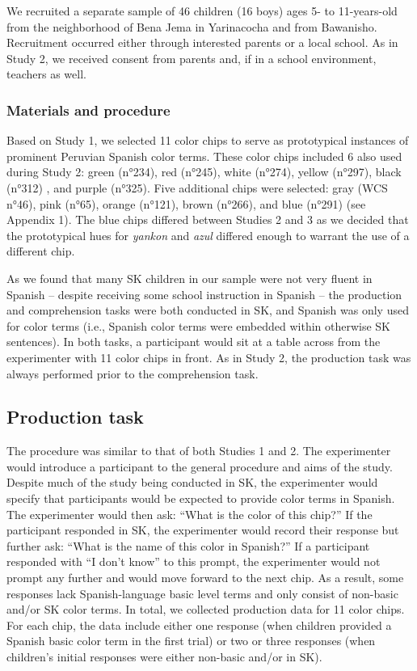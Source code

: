 \documentclass[
  english,
  ,apa7,floatsintext]{apa6}
\begin{document}
We recruited a separate sample of 46 children (16 boys) ages 5- to 11-years-old from the neighborhood of Bena Jema in Yarinacocha and from Bawanisho. Recruitment occurred either through interested parents or a local school. As in Study 2, we received consent from parents and, if in a school environment, teachers as well.

\hypertarget{materials-and-procedure-2}{%
\subsubsection{Materials and procedure}\label{materials-and-procedure-2}}

Based on Study 1, we selected 11 color chips to serve as prototypical instances of prominent Peruvian Spanish color terms. These color chips included 6 also used during Study 2: green (n°234), red (n°245), white (n°274), yellow (n°297), black (n°312) , and purple (n°325). Five additional chips were selected: gray (WCS n°46), pink (n°65), orange (n°121), brown (n°266), and blue (n°291) (see Appendix 1). The blue chips differed between Studies 2 and 3 as we decided that the prototypical hues for \emph{yankon} and \emph{azul} differed enough to warrant the use of a different chip.

As we found that many SK children in our sample were not very fluent in Spanish -- despite receiving some school instruction in Spanish -- the production and comprehension tasks were both conducted in SK, and Spanish was only used for color terms (i.e., Spanish color terms were embedded within otherwise SK sentences). In both tasks, a participant would sit at a table across from the experimenter with 11 color chips in front. As in Study 2, the production task was always performed prior to the comprehension task.

\hypertarget{production-task-1}{%
\subsection{Production task}\label{production-task-1}}

The procedure was similar to that of both Studies 1 and 2. The experimenter would introduce a participant to the general procedure and aims of the study. Despite much of the study being conducted in SK, the experimenter would specify that participants would be expected to provide color terms in Spanish. The experimenter would then ask: ``What is the color of this chip?'' If the participant responded in SK, the experimenter would record their response but further ask: ``What is the name of this color in Spanish?'' If a participant responded with ``I don't know'' to this prompt, the experimenter would not prompt any further and would move forward to the next chip. As a result, some responses lack Spanish-language basic level terms and only consist of non-basic and/or SK color terms. In total, we collected production data for 11 color chips. For each chip, the data include either one response (when children provided a Spanish basic color term in the first trial) or two or three responses (when children's initial responses were either non-basic and/or in SK).
\end{document}
